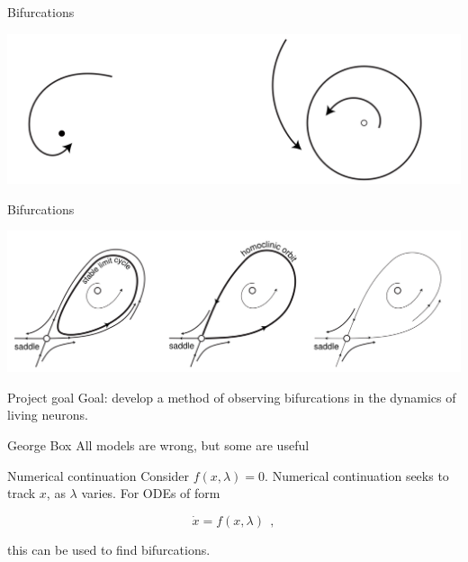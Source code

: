 \documentclass[aspectratio=169]{beamer}
\begin{document}
\begin{frame}[label={sec:orgdf3da99}]{Bifurcations}
\begin{center}
\includegraphics[width=.9\linewidth]{./hopf1.png}
\end{center}
\end{frame}

\begin{frame}[label={sec:orgf820b55}]{Bifurcations}
\begin{center}
\includegraphics[width=.9\linewidth]{./homoclinic.png}
\end{center}
\end{frame}


\begin{frame}[label={sec:org6be62d5}]{Project goal}
Goal: develop a method of observing bifurcations in the dynamics of living neurons.


\vspace{1cm}
\begin{block}{George Box}
All models are wrong, but some are useful
\end{block}
\end{frame}



\begin{frame}[label={sec:org44e7ad1}]{Numerical continuation}
Consider \(f(x,\lambda)=0\).
Numerical continuation seeks to track \(x\), as \(\lambda\) varies.
For ODEs of form

$$\dot{x} = f(x,\lambda)~~,$$

this can be used to find bifurcations.
\end{frame}
\end{document}
